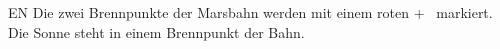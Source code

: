 \documentclass{article}
\begin{document}
\thispagestyle{empty}
\sffamily
\LARGE
\pagecolor{black}
\color{white}
\noindent
EN Die zwei Brennpunkte der Marsbahn werden mit
einem \color{red}roten +\color{white} ~markiert.
Die Sonne steht in einem Brennpunkt der Bahn. 
\end{document}
